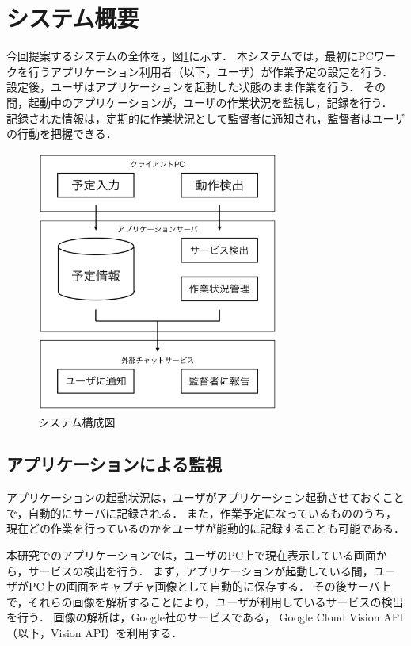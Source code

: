 \section{システム概要}
今回提案するシステムの全体を，図\ref{fig:structure_chart}に示す．
本システムでは，最初にPCワークを行うアプリケーション利用者（以下，ユーザ）が作業予定の設定を行う．
設定後，ユーザはアプリケーションを起動した状態のまま作業を行う．
その間，起動中のアプリケーションが，ユーザの作業状況を監視し，記録を行う．
記録された情報は，定期的に作業状況として監督者に通知され，監督者はユーザの行動を把握できる．

\begin{figure}[h]
  \begin{center}
  \includegraphics[width=8.0cm]{../graphics/structure_chart.png}
  \caption{システム構成図}
  \label{fig:structure_chart}
  \end{center}
\end{figure}

\subsection{アプリケーションによる監視}
アプリケーションの起動状況は，ユーザがアプリケーション起動させておくことで，自動的にサーバに記録される．
また，作業予定になっているもののうち，現在どの作業を行っているのかをユーザが能動的に記録することも可能である．

本研究でのアプリケーションでは，ユーザのPC上で現在表示している画面から，サービスの検出を行う．
まず，アプリケーションが起動している間，ユーザがPC上の画面をキャプチャ画像として自動的に保存する．
その後サーバ上で，それらの画像を解析することにより，ユーザが利用しているサービスの検出を行う．
画像の解析は，Google社のサービスである， Google Cloud Vision API （以下，Vision API）を利用する\cite{visionAPI}．

